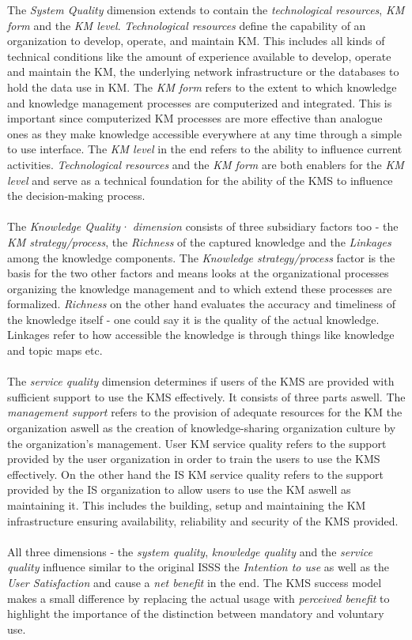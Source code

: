 \documentclass[
	english,
	ruledheaders=section,%
	class=report,%
	thesis={type=bachelor},%
	accentcolor=1b,%
	custommargins=true,%
	marginpar=false,%
	parskip=half-,%
	fontsize=11pt,%
	DIV=14,
]{tudapub}
\begin{document}
The \textit{System Quality} dimension extends to contain the \textit{technological resources}, \textit{KM form} and the \textit{KM level}. \textit{Technological resources} define the capability of an organization to develop, operate, and maintain KM. This includes all kinds of technical conditions like the amount of experience available to develop, operate and maintain the KM, the underlying network infrastructure or the databases to hold the data use in KM. The \textit{KM form} refers to the extent to which knowledge and knowledge management processes are computerized and integrated. This is important since computerized KM processes are more effective than analogue ones as they make knowledge accessible everywhere at any time through a simple to use interface. The \textit{KM level} in the end refers to the ability to influence current activities. \textit{Technological resources} and the \textit{KM form} are both enablers for the \textit{KM level} and serve as a technical foundation for the ability of the KMS to influence the decision-making process.\\\\
The \textit{Knowledge Quality· dimension} consists of three subsidiary factors too - the \textit{KM strategy/process}, the \textit{Richness} of the captured knowledge and the \textit{Linkages} among the knowledge components. The \textit{Knowledge strategy/process} factor is the basis for the two other factors and means looks at the organizational processes organizing the knowledge management and to which extend these processes are formalized. \textit{Richness} on the other hand evaluates the accuracy and timeliness of the knowledge itself - one could say it is the quality of the actual knowledge. Linkages refer to how accessible the knowledge is through things like knowledge and topic maps etc.\\\\
The \textit{service quality} dimension determines if users of the KMS are provided with sufficient support to use the KMS effectively. It consists of three parts aswell. The \textit{management support} refers to the provision of adequate resources for the KM the organization aswell as the creation of knowledge-sharing organization culture by the organization's management. User KM service quality refers to the support provided by the user organization in order to train the users to use the KMS effectively. On the other hand the IS KM service quality refers to the support provided by the  IS organization to allow users to use the KM aswell as maintaining it. This includes the building, setup and maintaining the KM infrastructure ensuring availability, reliability and security of the KMS provided.\\\\
All three dimensions - the \textit{system quality}, \textit{knowledge quality} and the \textit{service quality} influence similar to the original ISSS the \textit{Intention to use} as well as the \textit{User Satisfaction} and cause a \textit{net benefit} in the end. The KMS success model makes a small difference by replacing the actual usage with \textit{perceived benefit} to highlight the importance of the distinction between mandatory and voluntary use.
\end{document}
